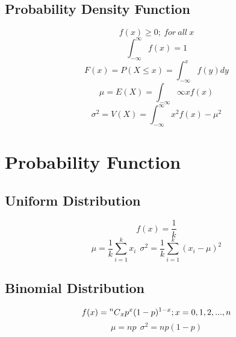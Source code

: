\documentclass[twocolumn]{article}
\newcommand\Comb[2][^n]{\prescript{#1\mkern-0.5mu}{}C_{#2}}
\begin{document}
\subsection{Probability Density Function}
\begin{equation}
    f(x) \geq 0;\ for\ all\ x
\end{equation}
\begin{equation}
    \int_{-\infty}^{\infty} f(x) = 1
\end{equation}
\begin{equation}
    F(x) = P(X \leq x) = \int_{-\infty}^{x} f(y)dy
\end{equation}
\begin{equation}
    \mu = E(X) = \int_{-\infty}{\infty} xf(x)
\end{equation}
\begin{equation}
    \sigma^{2} = V(X) = \int_{-\infty}^{\infty} x^{2}f(x) - \mu^{2}
\end{equation}

\section{Probability Function}
\subsection{Uniform Distribution}
\begin{equation}
    f(x) = \frac{1}{k}
\end{equation}
\begin{equation}
    \mu = \frac{1}{k} \sum_{i=1}^{k} x_{i}\ \ 
    \sigma^{2} = \frac{1}{k} \sum_{i=1}^{k} (x_{i}-\mu)^{2}
\end{equation}
\subsection{Binomial Distribution}
\begin{equation}
    f(x) = \Comb[n]{x} p^{x}(1-p)^{1-x}; x = 0,1,2,...,n
\end{equation}
\begin{equation}
    \mu = np\ \ 
    \sigma^{2} = np(1-p)
\end{equation}
\end{document}
